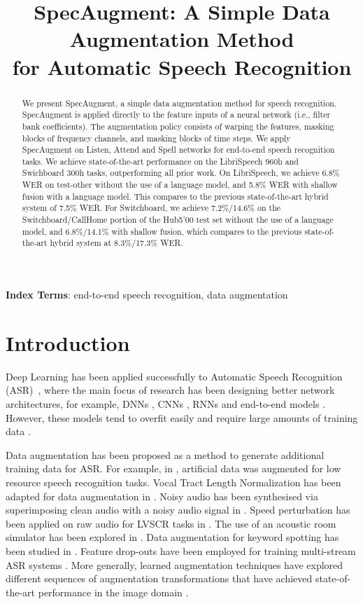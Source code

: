 \documentclass[a4paper]{article}
\title{SpecAugment: A Simple Data Augmentation Method\\
for Automatic Speech Recognition}
\begin{document}
\maketitle
% 
\begin{abstract}
We present SpecAugment, a simple data augmentation method for speech recognition. SpecAugment is applied directly to the feature inputs of a neural network (i.e., filter bank coefficients). The augmentation policy consists of warping the features, masking blocks of frequency channels, and masking blocks of time steps. We apply SpecAugment on Listen, Attend and Spell networks for end-to-end speech recognition tasks. We achieve state-of-the-art performance on the LibriSpeech 960h and Swichboard 300h tasks, outperforming all prior work. On LibriSpeech, we achieve 6.8\% WER on test-other without the use of a language model, and 5.8\% WER with shallow fusion with a language model. This compares to the previous state-of-the-art hybrid system of 7.5\% WER. For Switchboard, we achieve 7.2\%/14.6\% on the Switchboard/CallHome portion of the Hub5'00 test set without the use of a language model, and 6.8\%/14.1\% with shallow fusion, which compares to the previous state-of-the-art hybrid system at 8.3\%/17.3\% WER.
\end{abstract}
\noindent\textbf{Index Terms}: end-to-end speech recognition, data augmentation

\section{Introduction}

Deep Learning has been applied successfully to Automatic Speech Recognition (ASR)~\cite{hinton2012deep}, where the main focus of research has been  designing better  network architectures, for example, DNNs \cite{dahl-ieeetasl-2012}, CNNs \cite{sainath-icassp-2013}, RNNs \cite{graves-icassp-2013} and end-to-end models \cite{graves-icml-2014,Chan2016ListenAA,bahdanau-icassp-2016}. However, these  models tend to overfit easily and require large amounts of training data \cite{chiu-icassp-2018}.

Data augmentation has been proposed as a method to generate additional training data for ASR. For example, in \cite{kanda-asru-2013,ragni-interspeech-2014}, artificial data was augmented for low resource speech recognition tasks. Vocal Tract Length Normalization has been adapted for data augmentation in \cite{jaitly-2013-icml}. Noisy audio has been synthesised via superimposing clean audio with a noisy audio signal in \cite{hannun-arxiv-2014}. Speed perturbation has been applied on raw audio for LVSCR tasks in \cite{ko-interspeech-2015}. The use of an acoustic room simulator has been explored in \cite{kim-interspeech-2017}. Data augmentation for keyword spotting has been studied in \cite{prabhavalkar-2015-icassp, raju-arxiv-2018}. Feature drop-outs have been employed for training multi-stream ASR systems \cite{mallidi-icassp-2016}. More generally, learned augmentation techniques have explored different sequences of augmentation transformations that have achieved state-of-the-art performance in the image domain \cite{Cubuk2018AutoAugmentLA}.
\end{document}
